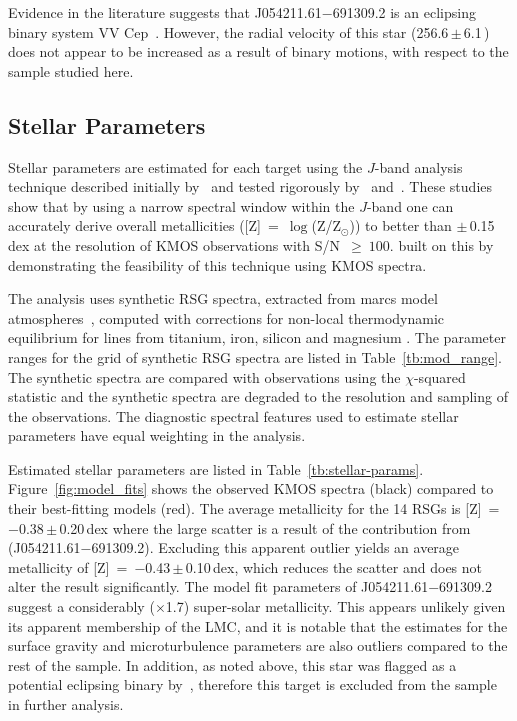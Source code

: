 Evidence in the literature suggests that J054211.61$-$691309.2 is an eclipsing binary system VV Cep~\citep{1979MNRAS.186..831F}.
However, the radial velocity of this star (256.6\,$\pm$\,6.1\,\kms) does not appear to be increased as a result of binary motions, with respect to the sample studied here.


\subsection{Stellar Parameters} %
\label{sub:stellar_parameters}

Stellar parameters are estimated for each target using the $J$-band analysis technique described initially by~\cite{2010MNRAS.407.1203D}
and tested rigorously by~\cite{2014ApJ...788...58G} and~\cite{2015ApJ...806...21D}.
These studies show that by using a narrow spectral window within the $J$-band one can accurately derive overall metallicities
([Z]~=~$\log$(Z/Z$_{\odot}$)) to better than
$\pm$\,0.15\,dex at the resolution of KMOS observations with S/N~$\ge~100$.
\cite{2015ApJ...803...14P} built on this by demonstrating the feasibility of this technique using KMOS spectra.

The analysis uses synthetic RSG spectra, extracted from {\sc marcs} model atmospheres~\citep{2008A&A...486..951G},
computed with corrections for non-local thermodynamic equilibrium for lines from titanium, iron, silicon and magnesium
\citep{2012ApJ...751..156B,2013ApJ...764..115B,2015ApJ...804..113B}.
The parameter ranges for the grid of synthetic RSG spectra are listed in Table~\ref{tb:mod_range}.
The synthetic spectra are compared with observations using the $\chi$-squared statistic and the synthetic spectra are degraded to the resolution and sampling of the observations.
The diagnostic spectral features used to estimate stellar parameters have equal weighting in the analysis.


Estimated stellar parameters are listed in Table~\ref{tb:stellar-params}.
Figure~\ref{fig:model_fits} shows the observed KMOS spectra (black) compared to their best-fitting models (red).
The average metallicity for the 14 RSGs is [Z]~=~$-$0.38\,$\pm$\,0.20\,dex where the large scatter is a result of the contribution from (J054211.61$-$691309.2).
Excluding this apparent outlier yields an average metallicity of [Z]~=~$-$0.43\,$\pm$\,0.10\,dex, which reduces the scatter and does not alter the result significantly.
The model fit parameters of J054211.61$-$691309.2 suggest a considerably ($\times$1.7) super-solar
metallicity.
This appears unlikely given its apparent membership of the LMC, and it is notable that the estimates for the surface gravity and microturbulence parameters are also outliers compared to the rest of the sample.
In addition, as noted above, this star was flagged as a potential eclipsing binary by~\citep{1979MNRAS.186..831F}, therefore this target is excluded from the sample in further analysis.

